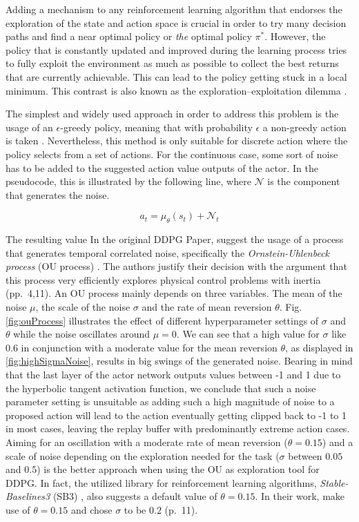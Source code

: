 Adding a mechanism to any reinforcement learning algorithm that endorses the exploration of the state and action space is crucial in order to try many decision paths and find a near optimal policy or \textit{the} optimal policy $\pi^*$. However, the policy that is constantly updated and improved during the learning process tries to fully exploit the environment as much as possible to collect the best returns that are currently achievable. This can lead to the policy getting stuck in a local minimum. This contrast is also known as the exploration–exploitation dilemma \cite[p.~3]{Sutton1998}.
\par
The simplest and widely used approach in order to address this problem is the usage of an $\epsilon$-greedy policy, meaning that with probability $\epsilon$ a non-greedy action is taken \cite[p.~100]{Sutton1998}. Nevertheless, this method is only suitable for discrete action where the policy selects from a set of actions. For the continuous case, some sort of noise has to be added to the suggested action value outputs of the actor. In the pseudocode, this is illustrated by the following line, where $\mathcal{N}$ is the component that generates the noise.
\par
\begin{equation*}
    a_t = \mu_\theta(s_t) + \mathcal{N}_t
\end{equation*}
\par 
The resulting value 
In the original DDPG Paper, \cite{lillicrap2019continuous} suggest the usage of a process that generates temporal correlated noise, specifically the \textit{Ornstein-Uhlenbeck process} (OU process) \cite[]{uhlenbeck1930theory}. The authors justify their decision with the argument that this process very efficiently explores physical control problems with inertia (pp.~4,11). An OU process mainly depends on three variables. The mean of the noise $\mu$, the scale of the noise $\sigma$ and the rate of mean reversion $\theta$. Fig. \ref{fig:ouProcess} illustrates the effect of different hyperparameter settings of $\sigma$ and $\theta$ while the noise oscillates around $\mu=0$. We can see that a high value for $\sigma$ like $0.6$ in conjunction with a moderate value for the mean reversion $\theta$, as displayed in \ref{fig:highSigmaNoise}, results in big swings of the generated noise. Bearing in mind that the last layer of the actor network outputs values between -1 and 1 due to the hyperbolic tangent activation function, we conclude that such a noise parameter setting is unsuitable as adding such a high magnitude of noise to a proposed action will lead to the action eventually getting clipped back to -1 to 1 in most cases, leaving the replay buffer with predominantly extreme action cases. Aiming for an oscillation with a moderate rate of mean reversion ($\theta = 0.15$) and a scale of noise depending on the exploration needed for the task ($\sigma$ between $0.05$ and $0.5$) is the better approach when using the OU as exploration tool for DDPG. In fact, the utilized library for reinforcement learning algorithms, \textit{Stable-Baselines3} (SB3) \cite[]{stable-baselines3}, also suggests a default value of $\theta = 0.15$. In their work, \cite{lillicrap2019continuous} make use of $\theta = 0.15$ and chose $\sigma$ to be $0.2$ (p.~11).
